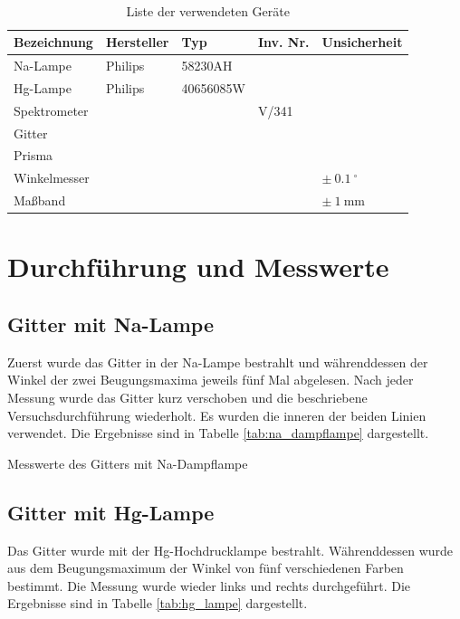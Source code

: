 \documentclass{article}
\begin{document}
\begin{table}[H]
\caption{Liste der verwendeten Geräte}

~

\begin{tabular}{l|llll}
Bezeichnung & Hersteller & Typ & Inv. Nr. & Unsicherheit \\
\hline
Na-Lampe & Philips & 58230AH \\
Hg-Lampe & Philips & 40656085W \\
Spektrometer & & & V/341 \\
Gitter & & \\
Prisma & & \\
Winkelmesser & & & & $\pm~0.1~^\circ$ \\
Maßband & & & & $\pm~1~$mm
\end{tabular}

\end{table}




\section{Durchführung und Messwerte}


\subsection{Gitter mit Na-Lampe}

Zuerst wurde das Gitter in der Na-Lampe bestrahlt und währenddessen der Winkel der zwei Beugungsmaxima jeweils fünf Mal abgelesen. Nach jeder Messung wurde das Gitter kurz verschoben und die beschriebene Versuchsdurchführung wiederholt. Es wurden die inneren der beiden Linien verwendet. Die Ergebnisse sind in Tabelle \ref{tab:na_dampflampe} dargestellt.

\begin{table}[H]
\caption{Messwerte des Gitters mit Na-Dampflampe}
\label{tab:na_dampflampe}
\centering

\end{table}

\subsection{Gitter mit Hg-Lampe}

Das Gitter wurde mit der Hg-Hochdrucklampe bestrahlt. Währenddessen wurde aus dem Beugungsmaximum der Winkel von fünf verschiedenen Farben bestimmt. Die Messung wurde wieder links und rechts durchgeführt. Die Ergebnisse sind in Tabelle \ref{tab:hg_lampe} dargestellt.
\end{document}

